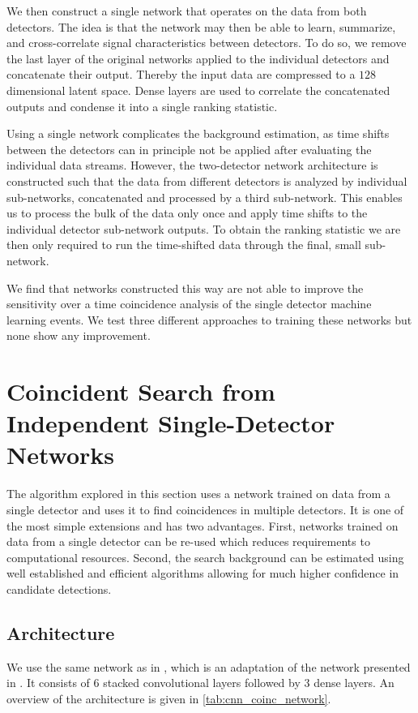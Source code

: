 We then construct a single network that operates on the data from both detectors. The idea is that the network may then be able to learn, summarize, and cross-correlate signal characteristics between detectors. To do so, we remove the last layer of the original networks applied to the individual detectors and concatenate their output. Thereby the input data are compressed to a $128$ dimensional latent space. Dense layers are used to correlate the concatenated outputs and condense it into a single ranking statistic.

Using a single network complicates the background estimation, as time shifts between the detectors can in principle not be applied after evaluating the individual data streams. However, the two-detector network architecture is constructed such that the data from different detectors is analyzed by individual sub-networks, concatenated and processed by a third sub-network. This enables us to process the bulk of the data only once and apply time shifts to the individual detector sub-network outputs. To obtain the ranking statistic we are then only required to run the time-shifted data through the final, small sub-network.

We find that networks constructed this way are not able to improve the sensitivity over a time coincidence analysis of the single detector machine learning events. We test three different approaches to training these networks but none show any improvement.


\section{Coincident Search from Independent Single-Detector Networks}\label{sec:cnn_coinc_methods}
The algorithm explored in this section uses a network trained on data from a single detector and uses it to find coincidences in multiple detectors. It is one of the most simple extensions and has two advantages. First, networks trained on data from a single detector can be re-used which reduces requirements to computational resources. Second, the search background can be estimated using well established and efficient algorithms allowing for much higher confidence in candidate detections.

\subsection{Architecture}
We use the same network as in \cite{Schafer:2021fea}, which is an adaptation of the network presented in \cite{Gabbard:2017lja}. It consists of 6 stacked convolutional layers followed by 3 dense layers. An overview of the architecture is given in \autoref{tab:cnn_coinc_network}.

